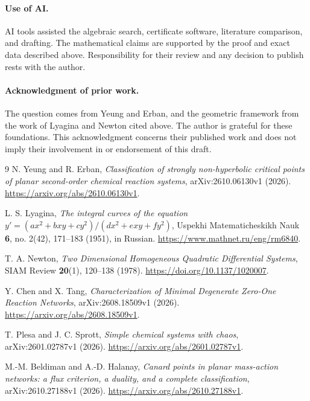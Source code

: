 \documentclass[11pt,a4paper]{article}
\theoremstyle{definition}\newtheorem{definition}[theorem]{Definition}
\begin{document}
\paragraph{Use of AI.}
AI tools assisted the algebraic search, certificate software, literature
comparison, and drafting. The mathematical claims are supported by the
proof and exact data described above. Responsibility for their review and
any decision to publish rests with the author.

\paragraph{Acknowledgment of prior work.}
The question comes from Yeung and Erban, and the geometric framework from
the work of Lyagina and Newton cited above. The author is grateful for
these foundations. This acknowledgment concerns their published work and
does not imply their involvement in or endorsement of this draft.

\begin{thebibliography}{9}
 N. Yeung and R. Erban,
\emph{Classification of strongly non-hyperbolic critical points of planar
second-order chemical reaction systems}, arXiv:2610.06130v1 (2026).
\url{https://arxiv.org/abs/2610.06130v1}.

 L. S. Lyagina,
\emph{The integral curves of the equation
$y'=(ax^2+bxy+cy^2)/(dx^2+exy+fy^2)$},
Uspekhi Matematicheskikh Nauk \textbf{6}, no. 2(42), 171--183 (1951),
in Russian. \url{https://www.mathnet.ru/eng/rm6840}.

 T. A. Newton,
\emph{Two Dimensional Homogeneous Quadratic Differential Systems},
SIAM Review \textbf{20}(1), 120--138 (1978).
\url{https://doi.org/10.1137/1020007}.

 Y. Chen and X. Tang,
\emph{Characterization of Minimal Degenerate Zero-One Reaction Networks},
arXiv:2608.18509v1 (2026). \url{https://arxiv.org/abs/2608.18509v1}.

 T. Plesa and J. C. Sprott,
\emph{Simple chemical systems with chaos}, arXiv:2601.02787v1 (2026).
\url{https://arxiv.org/abs/2601.02787v1}.

 M.-M. Beldiman and A.-D. Halanay,
\emph{Canard points in planar mass-action networks: a flux criterion,
a duality, and a complete classification}, arXiv:2610.27188v1 (2026).
\url{https://arxiv.org/abs/2610.27188v1}.
\end{thebibliography}
\end{document}
